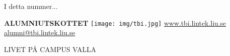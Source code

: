 \documentclass[10pt,final,hyphenatedtitles]{papertex}
\renewcommand{\todo}[1]{}
\begin{document}
\begin{frontpage}

\begin{indexblock}{I detta nummer...}






\end{indexblock}


\todo{ta bort, sätt in logo, hemsida, kontaktuppgifter}
\begin{authorblock}
\textbf{ALUMNIUTSKOTTET}
\texttt{[image: img/tbi.jpg]}
\url{www.tbi.lintek.liu.se}
\href{mailto:alumni@tbi.lintek.liu.se}{alumni@tbi.lintek.liu.se}
\end{authorblock}



\begin{weatherblock}{LIVET PÅ CAMPUS VALLA}

\end{weatherblock}

\end{frontpage}



\newsection{}



\newssep



\clearpage








\clearpage


\clearpage



\newssep



\clearpage



\clearpage 



\clearpage



%
\end{document}
